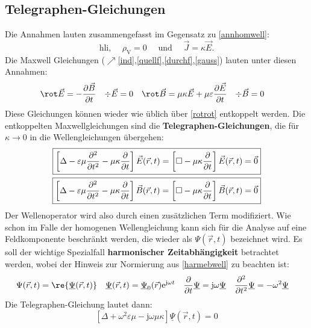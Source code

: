    \subsection{Telegraphen-Gleichungen}
    Die Annahmen lauten zusammengefasst im Gegensatz zu \ref{annhomwell}:
 \begin{equation}\label{anntelegraph}
 	\text{hli, }\quad\rho_\text{V}=0 \quad \text{ und }\quad\vec{J}=\kappa\vec{E}.
 \end{equation}
 Die Maxwell Gleichungen ($\nearrow$\ref{ind},\ref{quellf},\ref{durchf},\ref{gauss}) lauten unter diesen Annahmen:
		        \begin{align}
			        \rot \vec{E} & = -\frac{\partial \vec{B} }{\partial t} & \div \vec{E} & = 0 & \rot \vec{B} & = \mu\kappa \vec{E} + \mu\varepsilon \frac{\partial \vec{E}}{\partial t} & \div \vec{B} & = 0
		        \end{align}
		  Diese Gleichungen können wieder wie üblich über \ref{rotrot} entkoppelt werden. Die entkoppelten Maxwellgleichungen sind die \textbf{Telegraphen-Gleichungen}, die für \(\kappa \to 0\) in die Wellengleichungen übergehen:
		        \begin{equation}\begin{split}
				        \Aboxed{\left[\Delta - \varepsilon\mu \frac{\partial^2}{\partial t^2} -\mu\kappa \frac{\partial}{\partial t}\right]\vec{E}(\vec{r} , t) = \left[\square -\mu\kappa \frac{\partial}{\partial t}\right]\vec{E}(\vec{r} , t) &= \vec{0}}\\
				        \Aboxed{\left[\Delta - \varepsilon\mu \frac{\partial^2}{\partial t^2} -\mu\kappa \frac{\partial}{\partial t}\right]\vec{B} (\vec{r} , t) = \left[\square -\mu\kappa \frac{\partial}{\partial t}\right]\vec{B} (\vec{r} , t)&= \vec{0}}
			        \end{split}\end{equation}
		  Der Wellenoperator wird also durch einen zusätzlichen Term modifiziert. Wie schon im Falle der homogenen Wellengleichung kann sich für die Analyse auf eine Feldkomponente beschränkt werden, die wieder als \(\Psi(\vec{r} , t)\) bezeichnet wird. Es soll der wichtige Spezialfall \textbf{harmonischer Zeitabhängigkeit} betrachtet werden, wobei der Hinweis zur Normierung aus \ref{harmebwell} zu beachten ist:
		        \begin{align}
			        \Psi(\vec{r} , t) & = \re{\underline{\Psi}(\vec{r} , t)} & \underline{\Psi}(\vec{r} , t) & = \underline{\Psi}_0(\vec{r} )  \mathrm{e}^{\mathrm{j}\omega t} & \frac{\partial}{\partial t} \underline{\Psi} & = \mathrm{j}\omega \underline{\Psi} & \frac{\partial^2}{\partial t^2} \underline{\Psi} & = -\omega^2 \underline{\Psi}
		        \end{align}
		   Die Telegraphen-Gleichung lautet dann:
		        \begin{equation}
			        \boxed{\left[ \Delta + \omega^2\varepsilon\mu - \mathrm{j}\omega\mu\kappa \right] \underline{\Psi}(\vec{r} , t) =0}
		        \end{equation}
